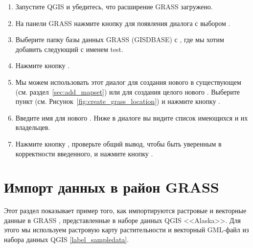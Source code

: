 \begin{enumerate}
  \item Запустите QGIS и убедитесь, что расширение GRASS загружено.
  \item На панели GRASS нажмите кнопку 
  для появления диалога с выбором .
  \item Выберите папку базы данных GRASS (GISDBASE) 
  с , где мы хотим добавить следующий
   с именем test.
  \item Нажмите кнопку .
  \item Мы можем использовать этот диалог для создания нового
   в существующем 
  (см. раздел~\ref{sec:add_mapset}) или для создания целого нового
  . Выберите пункт 
  (см. Рисунок~\ref{fig:create_grass_location}) и нажмите кнопку .
  \item Введите имя  для нового . Ниже
  в диалоге вы видите список имеющихся  и их владельцев.
  \item Нажмите кнопку , проверьте общий вывод, чтобы быть
  уверенным в корректности введенного, и нажмите кнопку .
\end{enumerate}

\section{Импорт данных в район GRASS}\label{sec:import_loc_data}

Этот раздел показывает пример того, как импортируются растровые и
векторные данные в  GRASS ,
представленные в наборе данных QGIS <<Alaska>>. Для этого мы используем
растровую карту растительности  и векторный
GML-файл  из набора данных QGIS \ref{label_sampledata}.

